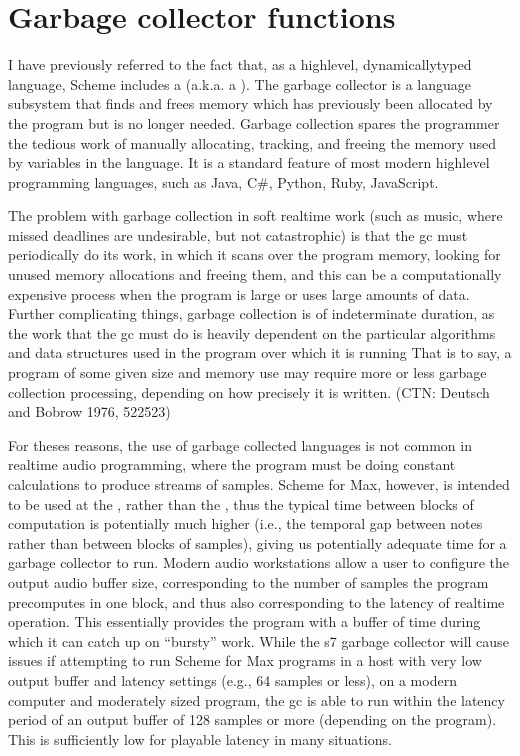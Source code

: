 \documentclass[letterpaper,10pt,english]{sphinxmanual}
\begin{document}
\section{Garbage collector functions}
\label{\detokenize{features_usage:garbage-collector-functions}}
\sphinxAtStartPar
I have previously referred to the fact that, as a high\sphinxhyphen{}level, dynamically\sphinxhyphen{}typed language, Scheme includes a
 (a.k.a. a ).
The garbage collector is a language subsystem that finds and
frees memory which has previously been allocated by the program but is no longer needed.
Garbage collection spares the programmer the tedious work of manually allocating,
tracking, and freeing the memory used by variables in the language.
It is a standard feature of most modern high\sphinxhyphen{}level programming languages,
such as Java, C\#, Python, Ruby, JavaScript.

\sphinxAtStartPar
The problem with garbage collection in soft real\sphinxhyphen{}time
work (such as music, where missed deadlines are undesirable, but not catastrophic)
is that the gc must periodically do its work, in which it scans over the program
memory, looking for unused memory allocations and freeing them, and
this can be a computationally expensive process when the program is large or
uses large amounts of data.
Further complicating things, garbage collection is of indeterminate duration,
as the work that the gc must do is heavily dependent on the particular algorithms
and data structures used in the program over which it is running
That is to say, a program of some given size and memory use may require more or less
garbage collection processing, depending on how precisely it is written. (CTN: Deutsch and Bobrow 1976, 522\sphinxhyphen{}523)

\sphinxAtStartPar
For theses reasons, the use of garbage\sphinxhyphen{} collected languages is not common
in real\sphinxhyphen{}time audio programming, where the program must be doing constant calculations
to produce streams of samples.
Scheme for Max, however, is intended to be used at the ,
rather than the , thus the typical time between blocks of computation
is potentially much higher (i.e., the temporal gap between notes rather than between blocks of samples),
giving us potentially adequate time for a garbage collector to run.
Modern audio workstations allow a user to configure the output audio buffer size,
corresponding to the number of samples the program pre\sphinxhyphen{}computes in one block, and thus
also corresponding to the latency of real\sphinxhyphen{}time operation.
This essentially provides the program with a buffer of time during which it can catch up
on “bursty” work.
While the s7 garbage collector will cause issues if attempting to run
Scheme for Max programs in a host with very low output buffer and latency settings (e.g.,
64 samples or less), on a modern computer and moderately sized program,
the gc is able to run within the latency period of an output buffer of 128 samples
or more (depending on the program). This is sufficiently low for playable latency
in many situations.
\end{document}
